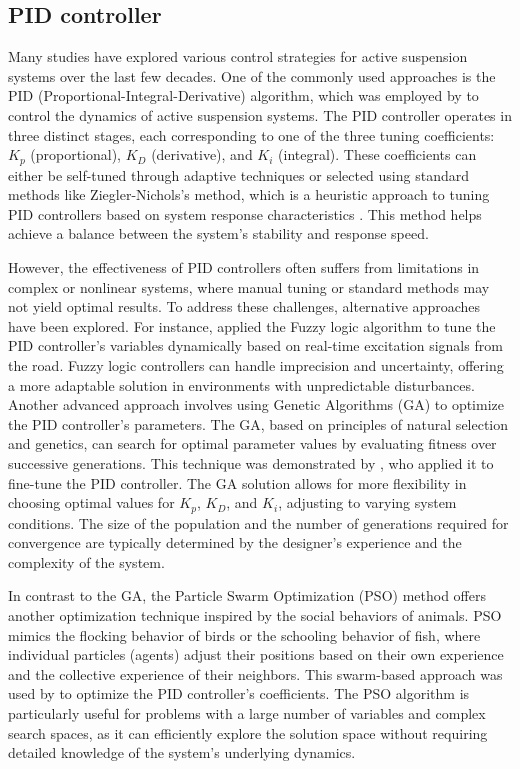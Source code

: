 \subsection{PID controller}
Many studies have explored various control strategies for active suspension systems over the last few decades. One of the commonly used approaches is the PID (Proportional-Integral-Derivative) algorithm, which was employed by \cite{duong2022modeling} to control the dynamics of active suspension systems. The PID controller operates in three distinct stages, each corresponding to one of the three tuning coefficients: $K_p$ (proportional), $K_D$ (derivative), and $K_i$ (integral). These coefficients can either be self-tuned through adaptive techniques or selected using standard methods like Ziegler-Nichols’s method, which is a heuristic approach to tuning PID controllers based on system response characteristics \cite{huba2021making}. This method helps achieve a balance between the system's stability and response speed.

However, the effectiveness of PID controllers often suffers from limitations in complex or nonlinear systems, where manual tuning or standard methods may not yield optimal results. To address these challenges, alternative approaches have been explored. For instance, \cite{chen2018modelling} applied the Fuzzy logic algorithm to tune the PID controller’s variables dynamically based on real-time excitation signals from the road. Fuzzy logic controllers can handle imprecision and uncertainty, offering a more adaptable solution in environments with unpredictable disturbances. Another advanced approach involves using Genetic Algorithms (GA) to optimize the PID controller’s parameters. The GA, based on principles of natural selection and genetics, can search for optimal parameter values by evaluating fitness over successive generations. This technique was demonstrated by \cite{metered2018optimized}, who applied it to fine-tune the PID controller. The GA solution allows for more flexibility in choosing optimal values for $K_p$, $K_D$, and $K_i$, adjusting to varying system conditions. The size of the population and the number of generations required for convergence are typically determined by the designer’s experience and the complexity of the system.

In contrast to the GA, the Particle Swarm Optimization (PSO) method offers another optimization technique inspired by the social behaviors of animals. PSO mimics the flocking behavior of birds or the schooling behavior of fish, where individual particles (agents) adjust their positions based on their own experience and the collective experience of their neighbors. This swarm-based approach was used by \cite{al2015quarter} to optimize the PID controller’s coefficients. The PSO algorithm is particularly useful for problems with a large number of variables and complex search spaces, as it can efficiently explore the solution space without requiring detailed knowledge of the system’s underlying dynamics.


